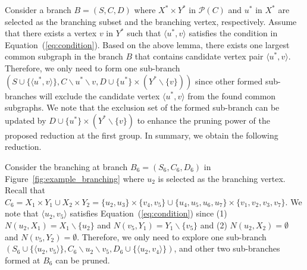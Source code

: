 Consider a branch $B=(S,C,D)$ where $ X^*\times Y^*$ in $\mathcal{P}(C)$ and $u^*$ in $X^*$ are selected as the branching subset and the branching vertex, {\chengC respectively}. 
Assume that there exists a vertex $v$ in $Y^*$ such that $\langle u^*,v \rangle$ satisfies the condition in Equation~(\ref{eq:condition}).
Based on the above lemma, there exists one largest common subgraph in the branch $B$ that contains candidate vertex pair $\langle u^*,v \rangle$. Therefore, we only need to form one sub-branch $(S\cup\{\langle u^*,v \rangle\},C\backslash u^*\backslash v,D\cup  \{u^*\}\times (Y^*\backslash\{v\}) )$ since other formed sub-branches will exclude the candidate vertex $\langle u^*,v \rangle$ from the found common subgraphs. We note that the exclusion set of the formed sub-branch can be updated by $D\cup  \{u^*\}\times (Y^*\backslash\{v\}) $ to enhance the pruning power of the proposed reduction at the first group. In summary, we obtain the following reduction.


\medskip
\noindent{}


\begin{example}
Consider the branching at branch $B_6=(S_6,C_6,D_6)$ in Figure~\ref{fig:example_branching} where  $u_2$ is selected as the branching vertex. Recall that $C_6=X_1\times Y_1 \cup X_2\times Y_2 =\{u_2,u_3\}\times \{v_4,v_5\} \cup \{u_4,u_5,u_6,u_7\}\times \{v_1,v_2,v_3,v_7\}$.
%
We note that $\langle u_2,v_5 \rangle$ satisfies Equation~(\ref{eq:condition}) since (1) $N(u_2,X_1)=X_1\backslash\{u_2\}$ and $N(v_5,Y_1)=Y_1\backslash\{v_5\}$ and (2) $N(u_2,X_2)=\emptyset$ and $N(v_5,Y_2)=\emptyset$. Therefore, we only need to explore one sub-branch $(S_6\cup\{\langle u_2,v_5\rangle\},C_6\backslash u_2\backslash v_5,D_6\cup\{\langle u_2,v_4 \rangle\})$, and other two sub-branches formed at $B_6$ can be pruned.
\end{example}




